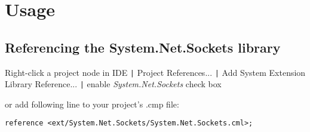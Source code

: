 \chapter{Usage}

\section{Referencing the System.Net.Sockets library}

Right-click a project node in IDE \verb.|. Project References... \verb.|.
Add System Extension Library Reference... \verb.|.
enable \emph{System.Net.Sockets} check box

\begin{flushleft}
or add following line to your project's .cmp file:
\begin{verbatim}
reference <ext/System.Net.Sockets/System.Net.Sockets.cml>;
\end{verbatim}
\end{flushleft}

